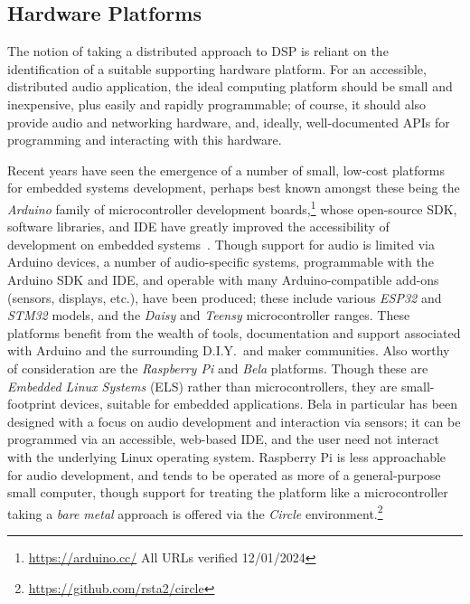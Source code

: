 \subsection{Hardware Platforms}\label{subsec:hardware-platforms}

The notion of taking a distributed approach to DSP is reliant on the
identification of a suitable supporting hardware platform.
For an accessible, distributed audio application, the ideal computing platform
should be small and inexpensive, plus easily and rapidly programmable;
of course, it should also provide audio and networking hardware, and, ideally,
well-documented APIs for programming and interacting with this hardware.

Recent years have seen the emergence of a number of small, low-cost platforms
for embedded systems development, perhaps best known amongst these being the
\textit{Arduino} family of microcontroller development boards,\footnote{
    \url{https://arduino.cc/} \textemdash{} All URLs verified 12/01/2024
}
whose open-source SDK, software libraries, and IDE have greatly improved the
accessibility of development on embedded systems~\citep{michon_embedded_2020}.
Though support for audio is limited via Arduino devices, a number of
audio-specific systems, programmable with the Arduino SDK and IDE, and
operable with many Arduino-compatible add-ons (sensors, displays, etc.), have
been produced;
these include various \textit{ESP32} and \textit{STM32} models, and the
\textit{Daisy} and \textit{Teensy} microcontroller ranges.
These platforms benefit from the wealth of tools, documentation and support
associated with Arduino and the surrounding D.I.Y.\ and maker communities.
Also worthy of consideration are the \textit{Raspberry Pi} and \textit{Bela}
platforms.
Though these are \textit{Embedded Linux Systems} (ELS) rather than
microcontrollers,
they are small-footprint devices, suitable for embedded applications.
Bela in particular has been designed with a focus on audio development and
interaction via sensors; it can be programmed via an accessible, web-based IDE,
and the user need not interact with the underlying Linux operating system.
Raspberry Pi is less approachable for audio development, and tends to be
operated as more of a general-purpose small computer, though support for
treating the platform like a microcontroller \textemdash{} taking a
\textit{bare metal} approach \textemdash{} is offered via the \textit{Circle}
environment.\footnote{\url{https://github.com/rsta2/circle}}

